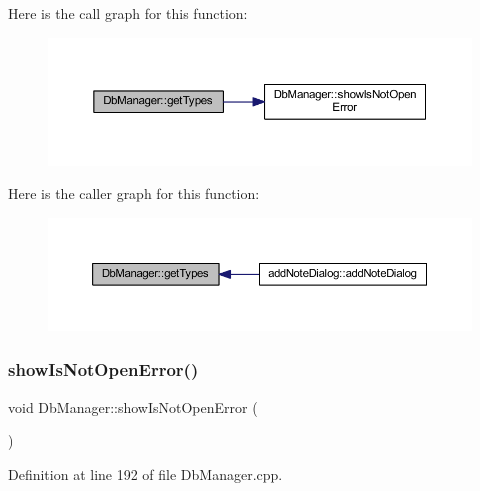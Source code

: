 Here is the call graph for this function\+:
\nopagebreak
\begin{figure}[H]
\begin{center}
\leavevmode
\includegraphics[width=350pt]{classDbManager_ade7585873652935bb12cb1ad546ceba2_cgraph}
\end{center}
\end{figure}
Here is the caller graph for this function\+:
\nopagebreak
\begin{figure}[H]
\begin{center}
\leavevmode
\includegraphics[width=350pt]{classDbManager_ade7585873652935bb12cb1ad546ceba2_icgraph}
\end{center}
\end{figure}
\hypertarget{classDbManager_a2d60ab2a556cf0276bf306c7545ed03d}{}\label{classDbManager_a2d60ab2a556cf0276bf306c7545ed03d} 
\subsubsection{\texorpdfstring{show\+Is\+Not\+Open\+Error()}{showIsNotOpenError()}}
{\footnotesize\ttfamily void Db\+Manager\+::show\+Is\+Not\+Open\+Error (\begin{DoxyParamCaption}{ }\end{DoxyParamCaption})\hspace{0.3cm}{\ttfamily [static]}}



Definition at line 192 of file Db\+Manager.\+cpp.

